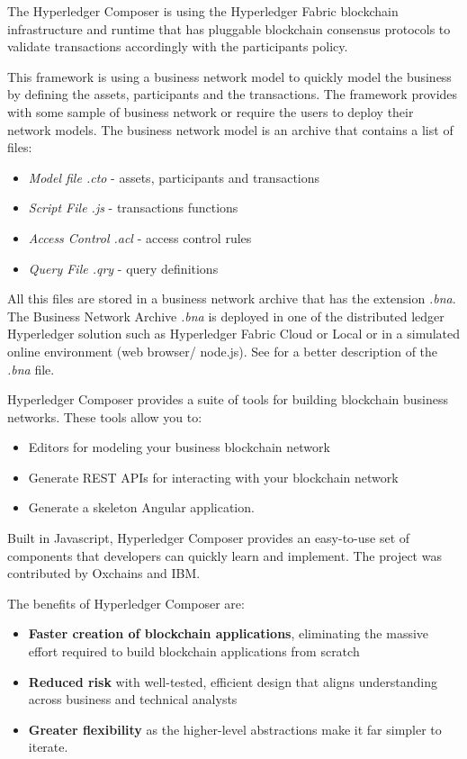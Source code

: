The Hyperledger Composer is using the Hyperledger Fabric blockchain infrastructure and runtime that has pluggable blockchain consensus protocols to validate transactions  accordingly with the participants policy.

This framework is using a business network model to quickly model the business by defining the assets, participants and the transactions. The framework provides with some sample of business network or require the users to deploy their network models.
The business network model is an archive that contains a list of files:
\begin{itemize}
	\item \emph{Model file .cto} - assets, participants and transactions
	\item \emph{Script File .js} - transactions functions
	\item \emph{Access Control .acl} - access control rules
	\item \emph{Query File .qry} - query definitions
\end{itemize}
All this files are stored in a business network archive that has the extension \emph{.bna}.
The Business Network Archive \emph{.bna} is deployed in one of the distributed ledger Hyperledger solution such as Hyperledger Fabric Cloud or Local or in a simulated online environment (web browser/ node.js). See  for a better description of the \emph{.bna} file. 


Hyperledger Composer provides a suite of tools for building blockchain business networks. These tools allow you to:
\begin{itemize}
	\item Editors for modeling your business blockchain network
	\item Generate REST APIs for interacting with your blockchain network
	\item Generate a skeleton Angular application.
\end{itemize}

Built in Javascript, Hyperledger Composer provides an easy-to-use set of components that developers can quickly learn and implement. The project was contributed by Oxchains and IBM.

The benefits of Hyperledger Composer are:
\begin{itemize}
	\item \textbf{Faster creation of blockchain applications}, eliminating the massive effort required to build blockchain applications from scratch
	\item \textbf{Reduced risk} with well-tested, efficient design that aligns understanding across business and technical analysts
	\item \textbf{Greater flexibility} as the higher-level abstractions make it far simpler to iterate.
\end{itemize}
\fi

 
